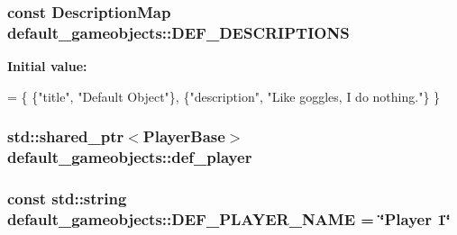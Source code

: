 \hypertarget{classdefault__gameobjects_abbebe0d0ab551b8e54391e90b360a514}{
\subsubsection[{D\-E\-F\-\_\-\-D\-E\-S\-C\-R\-I\-P\-T\-I\-O\-N\-S}]{\setlength{\rightskip}{0pt plus 5cm}const {\bf Description\-Map} default\-\_\-gameobjects\-::\-D\-E\-F\-\_\-\-D\-E\-S\-C\-R\-I\-P\-T\-I\-O\-N\-S\hspace{0.3cm}{\ttfamily [private]}}}\label{classdefault__gameobjects_abbebe0d0ab551b8e54391e90b360a514}
{\bfseries Initial value\-:}
\begin{DoxyCode}
= \{
        \{\textcolor{stringliteral}{"title"}, \textcolor{stringliteral}{"Default Object"}\},
        \{\textcolor{stringliteral}{"description"}, \textcolor{stringliteral}{"Like goggles, I do nothing."}\}
    \}
\end{DoxyCode}
\hypertarget{classdefault__gameobjects_a66ae835be72c7ce9cc5cec3970cb0834}{
\subsubsection[{def\-\_\-player}]{\setlength{\rightskip}{0pt plus 5cm}std\-::shared\-\_\-ptr$<${\bf Player\-Base}$>$ default\-\_\-gameobjects\-::def\-\_\-player\hspace{0.3cm}{\ttfamily [private]}}}\label{classdefault__gameobjects_a66ae835be72c7ce9cc5cec3970cb0834}
\hypertarget{classdefault__gameobjects_a0bdbe26cd36718ba9c628747c5323c55}{
\subsubsection[{D\-E\-F\-\_\-\-P\-L\-A\-Y\-E\-R\-\_\-\-N\-A\-M\-E}]{\setlength{\rightskip}{0pt plus 5cm}const std\-::string default\-\_\-gameobjects\-::\-D\-E\-F\-\_\-\-P\-L\-A\-Y\-E\-R\-\_\-\-N\-A\-M\-E = \char`\"{}Player 1\char`\"{}\hspace{0.3cm}{\ttfamily [private]}}}\label{classdefault__gameobjects_a0bdbe26cd36718ba9c628747c5323c55}
